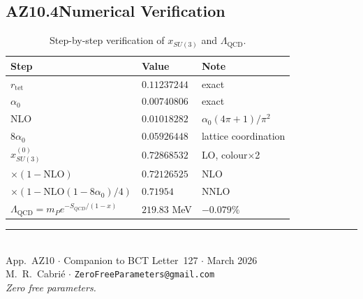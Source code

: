 \documentclass[aps,prl,twocolumn,showpacs,preprintnumbers]{revtex4-2}
\newcommand{\rtet}{r_{\mathrm{tet}}}
\newcommand{\azero}{\alpha_0}
\newcommand{\mP}{m_P}
\newcommand{\LQCD}{\Lambda_{\mathrm{QCD}}}
\newcommand{\NLO}{\mathrm{NLO}}
\begin{document}
\subsection*{AZ10.4\quad Numerical Verification}

\begin{table}[h]
\centering
\caption{Step-by-step verification of $x_{SU(3)}$ and $\LQCD$.}
\begin{tabular}{lll}
\toprule
Step & Value & Note \\
\midrule
$\rtet$ & $0.11237244$ & exact \\
$\azero$ & $0.00740806$ & exact \\
$\NLO$ & $0.01018282$ & $\azero(4\pi+1)/\pi^2$ \\
$8\azero$ & $0.05926448$ & lattice coordination \\
$x^{(0)}_{SU(3)}$ & $0.72868532$ & LO, colour$\times$2 \\
$\times(1-\NLO)$ & $0.72126525$ & NLO \\
$\times(1-\NLO(1-8\azero)/4)$ & $0.71954$ & NNLO \\
$\LQCD = \mP e^{-S_{QCD}/(1-x)}$ & $219.83$ MeV & \textbf{$-0.079\%$} \\
\bottomrule
\end{tabular}
\end{table}

\bigskip
\begin{center}
\rule{0.5\textwidth}{0.4pt}\\[4pt]
App.~AZ10 $\cdot$ Companion to BCT Letter~127 $\cdot$ March 2026\\
M.~R.~Cabri\'e $\cdot$ \texttt{ZeroFreeParameters@gmail.com}\\[2pt]
\textit{Zero free parameters.}
\end{center}
\end{document}
